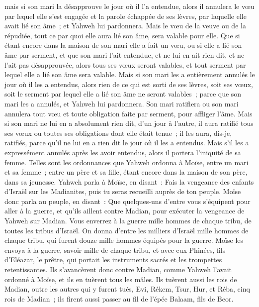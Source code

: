 \begin{multicols}{2}
mais si son mari la désapprouve le jour où il l'a entendue, alors il annulera le vœu par lequel elle s'est engagée et la parole échappée de ses lèvres, par laquelle elle avait lié son âme~; et Yahweh lui pardonnera.
Mais le vœu de la veuve ou de la répudiée, tout ce par quoi elle aura lié son âme, sera valable pour elle.
Que si étant encore dans la maison de son mari elle a fait un vœu, ou si elle a lié son âme par serment,
et que son mari l'ait entendue, et ne lui en ait rien dit, et ne l'ait pas désapprouvée, alors tous ses vœux seront valables, et tout serment par lequel elle a lié son âme sera valable.
Mais si son mari les a entièrement annulés le jour où il les a entendus, alors rien de ce qui est sorti de ses lèvres, soit ses vœux, soit le serment par lequel elle a lié son âme ne seront valables~; parce que son mari les a annulés, et Yahweh lui pardonnera.
Son mari ratifiera ou son mari annulera tout vœu et toute obligation faite par serment, pour affliger l'âme.
Mais si son mari ne lui en a absolument rien dit, d'un jour à l'autre, il aura ratifié tous ses vœux ou toutes ses obligations dont elle était tenue~; il les aura, dis-je, ratifiés, parce qu'il ne lui en a rien dit le jour où il les a entendus.
Mais s'il les a expressément annulés après les avoir entendus, alors il portera l'iniquité de sa femme.
Telles sont les ordonnances que Yahweh ordonna à Moïse, entre un mari et sa femme~; entre un père et sa fille, étant encore dans la maison de son père, dans sa jeunesse.
\VerseOne{}Yahweh parla à Moïse, en disant~:
Fais la vengeance des enfants d'Israël sur les Madianites, puis tu seras recueilli auprès de ton peuple.
Moïse donc parla au peuple, en disant~: Que quelques-uns d'entre vous s'équipent pour aller à la guerre, et qu'ils aillent contre Madian, pour exécuter la vengeance de Yahweh sur Madian.
Vous enverrez à la guerre mille hommes de chaque tribu, de toutes les tribus d'Israël.
On donna d'entre les milliers d'Israël mille hommes de chaque tribu, qui furent douze mille hommes équipés pour la guerre.
Moïse les envoya à la guerre, savoir mille de chaque tribu, et avec eux Phinées, fils d'Eléazar, le prêtre, qui portait les instruments sacrés et les trompettes retentissantes.
Ils s'avancèrent donc contre Madian, comme Yahweh l'avait ordonné à Moïse, et ils en tuèrent tous les mâles.
Ils tuèrent aussi les rois de Madian, outre les autres qui y furent tués, Evi, Rékem, Tsur, Hur, et Réba, cinq rois de Madian~; ils firent aussi passer au fil de l'épée Balaam, fils de Beor.

\end{multicols}
